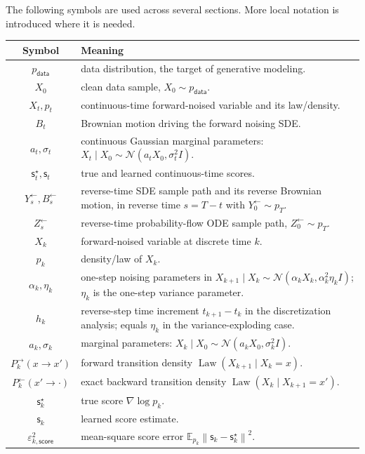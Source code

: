 \documentclass{amsart}
\numberwithin{equation}{section}
\theoremstyle{plain}
\theoremstyle{definition}
\theoremstyle{remark}
\DeclareMathOperator{\Law}{Law}
\newcommand{\E}{\mathbb{E}}
\newcommand{\Id}{I}
\newcommand{\norm}[1]{\left\lVert #1 \right\rVert}
\newcommand{\pdata}{p_{\mathsf{data}}}
\newcommand{\sstar}{\mathsf{s}^{\star}}
\newcommand{\score}{\mathsf{s}}
\newcommand{\epsscorek}{\varepsilon_{k,\mathsf{score}}}
\newcommand{\normal}[2]{\mathcal{N}\!\left(#1,#2\right)}
\begin{document}
The following symbols are used across several sections.  More local notation is
introduced where it is needed.
\begin{center}
\begin{tabular}{c|p{}}
Symbol & Meaning \\ \hline
$\pdata$ & data distribution, the target of generative modeling.\\
$X_0$ & clean data sample, $X_0\sim\pdata$.\\
$X_t,p_t$ & continuous-time forward-noised variable and its law/density.\\
$B_t$ & Brownian motion driving the forward noising SDE.\\
$a_t,\sigma_t$ & continuous Gaussian marginal parameters:
$X_t\mid X_0\sim\normal{a_tX_0}{\sigma_t^2\Id}$.\\
$\sstar_t,\score_t$ & true and learned continuous-time scores.\\
$Y^{\leftarrow}_s,B^{\leftarrow}_s$ & reverse-time SDE sample path and its
reverse Brownian motion, in reverse time $s=T-t$ with $Y^{\leftarrow}_0\sim p_T$.\\
$Z^{\leftarrow}_s$ & reverse-time probability-flow ODE sample path,
$Z^{\leftarrow}_0\sim p_T$.\\
$X_k$ & forward-noised variable at discrete time $k$.\\
$p_k$ & density/law of $X_k$.\\
$\alpha_k,\eta_k$ & one-step noising parameters in
$X_{k+1}\mid X_k\sim\normal{\alpha_kX_k}{\alpha_k^2\eta_k\Id}$; $\eta_k$ is the
one-step variance parameter.\\
$h_k$ & reverse-step time increment $t_{k+1}-t_k$ in the discretization
analysis; equals $\eta_k$ in the variance-exploding case.\\
$a_k,\sigma_k$ & marginal parameters:
$X_k\mid X_0\sim\normal{a_kX_0}{\sigma_k^2\Id}$.\\
$P_k^{\to}(x \to x')$ & forward transition density
$\Law(X_{k+1}\mid X_k=x)$.\\
$P_k^{\leftarrow}(x' \to \cdot)$ & exact backward transition density
$\Law(X_k\mid X_{k+1}=x')$.\\
$\sstar_k$ & true score $\nabla\log p_k$.\\
$\score_k$ & learned score estimate.\\
$\epsscorek^2$ & mean-square score error
$\E_{p_k}\norm{\score_k-\sstar_k}^2$.\\
\end{tabular}
\end{center}
\end{document}
